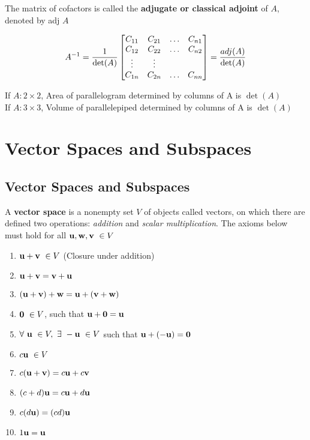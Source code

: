 \documentclass{report}
\begin{document}
The matrix of cofactors is called the \textbf{adjugate or classical adjoint} of $A$,
denoted by adj $A$

\begin{theorem}
    \[
    A^{-1} = \frac{1}{\det(A)}\begin{bmatrix}
        C_{11} & C_{21} &\ldots & C_{n1} \\
        C_{12} & C_{22} &\ldots & C_{n2} \\
        \vdots & \vdots & \\
        C_{1n} & C_{2n} &\ldots & C_{nn} \\
    \end{bmatrix} = \frac{adj(A)}{\det(A)}
    \] 
\end{theorem}

\begin{theorem}
    If $A: 2 \times 2$, Area of parallelogram determined by columns of A is $\det(A)$\\
    If $A: 3 \times 3$, Volume of parallelepiped determined by columns of A is $\det(A)$\\
\end{theorem}

\chapter{Vector Spaces and Subspaces}
\setcounter{theorem}{0}
\setcounter{definition}{0}
\section{Vector Spaces and Subspaces}

\begin{definition}
    A \textbf{vector space} is a nonempty set $V$ of objects called vectors, on which there are defined two operations:
    \textit{addition} and \textit{scalar multiplication}. The axioms below must hold for all $\mathbf{u}, \mathbf{w}, \mathbf{v} \ \in V$
\end{definition}
\begin{tcolorbox}[colback=blue!5!white, colframe=blue!75!black,title=Taweel Axioms]
\begin{enumerate}
    \item $\mathbf{u} + \mathbf{v} \ \in V$ (Closure under addition)
    \item $\mathbf{u} + \mathbf{v} = \mathbf{v} + \mathbf{u}$
    \item $(\mathbf{u} + \mathbf{v}) + \mathbf{w} = \mathbf{u} + (\mathbf{v} + \mathbf{w})$
    \item $\mathbf{0} \ \in V$, such that $\mathbf{u} + \mathbf{0} = \mathbf{u}$
    \item $\forall \ \uu \ \in V, \ \exists \ -\uu \ \in V$ such that $\mathbf{u} + (-\mathbf{u}) = \mathbf{0}$
    \item $c \mathbf{u} \ \in V$
    \item $c (\mathbf{u} + \mathbf{v}) = c \mathbf{u} + c \mathbf{v}$
    \item $(c + d) \mathbf{u} = c \mathbf{u} + d \mathbf{u}$
    \item $c (d \mathbf{u}) = (c d) \mathbf{u}$
    \item $1 \mathbf{u} = \mathbf{u}$
\end{enumerate}
\end{tcolorbox}
\end{document}

